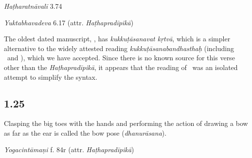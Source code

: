 \begin{ekdosis}
\begin{testimonia}[hp01_024]
\emph{Haṭharatnāvalī} 3.74

\begin{versinnote}
\end{versinnote}

\emph{Yuktabhavadeva} 6.17 (attr. \emph{Haṭhapradīpikā})

\begin{versinnote}
\end{versinnote}

\end{testimonia}

\begin{philcomm}[hp01_024]
The oldest dated manuscript, \etaOne, has \emph{kukkuṭāsanavat kṛtvā}, which is a simpler alternative to the widely attested reading \emph{kukkuṭāsanabandhasthaḥ} (including \alphaTwo\ and \alphaThree), which we have accepted. Since there is no known source for this verse other than the \emph{Haṭhapradīpikā}, it appears that the reading of \etaOne\ was an isolated attempt to simplify the syntax.
\end{philcomm}

\subsection*{1.25}
\begin{translation}[hp01_025]
Clasping the big toes with the hands and performing the action of drawing a bow as far as the ear is called the bow pose (\emph{dhanurāsana}).
\end{translation}

\begin{testimonia}[hp01_025]
\emph{Yogacintāmaṇi} f. 84r (attr. \emph{Haṭhapradīpikā})

\begin{versinnote}
\end{versinnote}


\end{testimonia}
\end{ekdosis}
